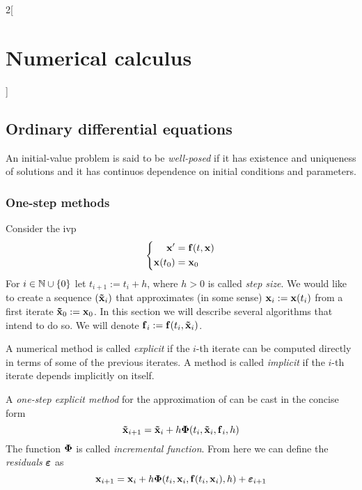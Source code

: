 \documentclass[../../../main_math.tex]{subfiles}
\begin{document}
\begin{multicols}{2}[\section{Numerical calculus}]
  \subsection{Ordinary differential equations}
  \begin{definition}
    An initial-value problem is said to be \emph{well-posed} if it has existence and uniqueness of solutions and it has continuos dependence on initial conditions and parameters.
  \end{definition}
  \subsubsection{One-step methods}
  Consider the ivp
  \begin{equation}\label{NC:ivp}
    \left\{
    \begin{aligned}
      \boldsymbol{\mathrm{x}}'     & = \boldsymbol{\mathrm{f}}(t,\boldsymbol{\mathrm{x}}) \\
      \boldsymbol{\mathrm{x}}(t_0) & = \boldsymbol{\mathrm{x}}_0
    \end{aligned}
    \right.
  \end{equation}
  For $i\in\mathbb{N}\cup\{0\}$ let $t_{i+1}:=t_{i}+h$, where $h>0$ is called \emph{step size}. We would like to create a sequence $(\boldsymbol{\mathrm{\tilde{x}}}_i)$ that approximates (in some sense) $\boldsymbol{\mathrm{{x}}}_i:=\boldsymbol{\mathrm{{x}}}(t_i)$ from a first iterate $\boldsymbol{\mathrm{\tilde{x}}}_0:=\boldsymbol{\mathrm{x}}_0$. In this section we will describe several algorithms that intend to do so. We will denote $\boldsymbol{\mathrm{f}}_i:=\boldsymbol{\mathrm{f}}(t_i,\boldsymbol{\mathrm{\tilde{x}}}_{i})$.
  \begin{definition}
    A numerical method is called \emph{explicit} if the $i$-th iterate can be computed directly in terms of some of the previous iterates. A method is called \emph{implicit} if the $i$-th iterate depends implicitly on itself.
  \end{definition}
  \begin{definition}
    A \emph{one-step explicit method} for the approximation of  can be cast in the concise form $$\boldsymbol{\mathrm{\tilde{x}}}_{i+1}=\boldsymbol{\mathrm{\tilde{x}}}_{i}+h\boldsymbol{\mathrm{\Phi}}(t_i,\boldsymbol{\mathrm{\tilde{x}}}_{i},\boldsymbol{\mathrm{f}}_i,h)$$
    The function $\boldsymbol{\mathrm{\Phi}}$ is called \emph{incremental function}. From here we can define the \emph{residuals} $\boldsymbol{\mathrm{\varepsilon}}$ as
    $$\boldsymbol{\mathrm{x}}_{i+1}=\boldsymbol{\mathrm{x}}_{i}+h\boldsymbol{\mathrm{\Phi}}(t_i,\boldsymbol{\mathrm{x}}_{i},\boldsymbol{\mathrm{f}}(t_i,\boldsymbol{\mathrm{x}}_i),h)+\boldsymbol{\mathrm{\varepsilon}}_{i+1}$$

\end{definition}
\end{multicols}
\end{document}

